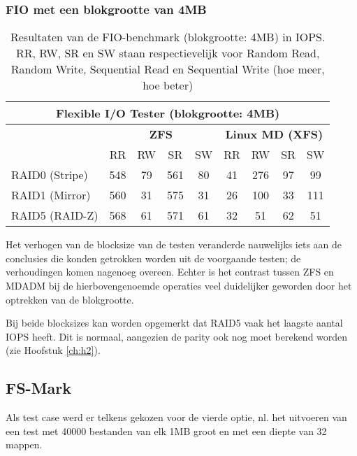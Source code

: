 \subsubsection{FIO met een blokgrootte van 4MB}

\begin{table}[h]
  \centering
  \begin{tabular}{l || c c c c | c c c c}
    \hline
    \multicolumn{9}{c}{\textbf{Flexible I/O Tester (blokgrootte: 4MB)}} \\
    \hline
    & \multicolumn{4}{c|}{\textbf{ZFS}} & \multicolumn{4}{|c}{\textbf{Linux MD (XFS)}} \\
    & RR & RW & SR & SW & RR & RW & SR & SW \\
    \hline
    RAID0 (Stripe) & 548 & 79 & 561 & 80 & 41 & 276 & 97 & 99 \\
    RAID1 (Mirror) & 560 & 31 & 575 & 31 & 26 & 100 & 33 & 111 \\
    RAID5 (RAID-Z) & 568 & 61 & 571 & 61 & 32 & 51 & 62 & 51 \\
  \end{tabular}
  \caption{Resultaten van de FIO-benchmark (blokgrootte: 4MB) in IOPS. RR, RW, SR en SW staan respectievelijk voor Random Read, Random Write, Sequential Read en Sequential Write (hoe meer, hoe beter)}
  \label{tab:results_fio_4mb}
\end{table}

Het verhogen van de blocksize van de testen veranderde nauwelijks iets aan de conclusies die konden getrokken worden uit de voorgaande testen; de verhoudingen komen nagenoeg overeen. Echter is het contrast tussen ZFS en MDADM bij de hierbovengenoemde operaties veel duidelijker geworden door het optrekken van de blokgrootte. 

Bij beide blocksizes kan worden opgemerkt dat RAID5 vaak het laagste aantal IOPS heeft. Dit is normaal, aangezien de parity ook nog moet berekend worden (zie Hoofstuk \ref{ch:h2}).

\subsection{FS-Mark}

Als test case werd er telkens gekozen voor de vierde optie, nl. het uitvoeren van een test met 40000 bestanden van elk 1MB groot en met een diepte van 32 mappen. 

